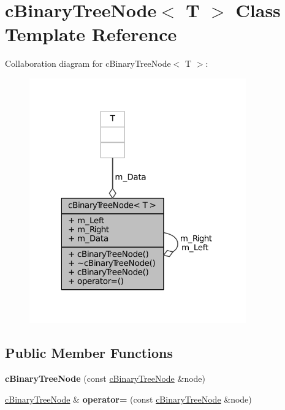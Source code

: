 \hypertarget{classcBinaryTreeNode}{
\section{c\-Binary\-Tree\-Node$<$ \-T $>$ \-Class \-Template \-Reference}
\label{classcBinaryTreeNode}
}


\-Collaboration diagram for c\-Binary\-Tree\-Node$<$ \-T $>$\-:
\nopagebreak
\begin{figure}[H]
\begin{center}
\leavevmode
\includegraphics[width=265pt]{classcBinaryTreeNode__coll__graph}
\end{center}
\end{figure}
\subsection*{\-Public \-Member \-Functions}
\begin{DoxyCompactItemize}
\item 
\hypertarget{classcBinaryTreeNode_adc269d0d538836cb899bd54efbb366ca}{
{\bfseries c\-Binary\-Tree\-Node} (const \hyperlink{classcBinaryTreeNode}{c\-Binary\-Tree\-Node} \&node)}
\label{classcBinaryTreeNode_adc269d0d538836cb899bd54efbb366ca}

\item 
\hypertarget{classcBinaryTreeNode_a6acbedf8573060c303a93aba3af33350}{
\hyperlink{classcBinaryTreeNode}{c\-Binary\-Tree\-Node} \& {\bfseries operator=} (const \hyperlink{classcBinaryTreeNode}{c\-Binary\-Tree\-Node} \&node)}
\label{classcBinaryTreeNode_a6acbedf8573060c303a93aba3af33350}

\end{DoxyCompactItemize}

